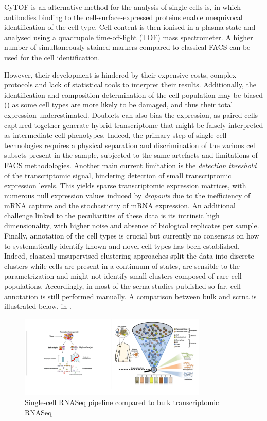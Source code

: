 CyTOF \autocite{nomizu_etal94} is an
alternative method for the analysis of single cells is, in which
antibodies binding to the cell-surface-expressed proteins enable
unequivocal identification of the cell type. Cell content is then
ionised in a plasma state and analysed using a quadrupole time-off-light
(TOF) mass spectrometer. A higher number of simultaneously stained
markers compared to classical FACS can be used for the cell
identification.

However, their development is hindered by their expensive costs, complex
protocols and lack of statistical tools to interpret their results.
Additionally, the identification and composition determination of the
cell population may be biased
(\autocite{lambrechts_etal18}) as
some cell types are more likely to be damaged, and thus their total
expression underestimated. Doublets can also bias the expression, as
paired cells captured together generate hybrid transcriptome that might
be falsely interpreted as intermediate cell phenotypes. Indeed, the
primary step of single cell technologies requires a physical separation
and discrimination of the various cell subsets present in the sample,
subjected to the same artefacts and limitations of FACS methodologies.
Another main current limitation is the \emph{detection threshold} of the
transcriptomic signal, hindering detection of small transcriptomic
expression levels. This yields sparse transcriptomic expression
matrices, with numerous null expression values induced by
\emph{dropouts} due to the inefficiency of mRNA capture and the
stochasticity of mRNA expression. An additional challenge linked to the
peculiarities of these data is its intrinsic high dimensionality, with
higher noise and absence of biological replicates per sample. Finally,
annotation of the cell types is crucial but currently no consensus on
how to systematically identify known and novel cell types has been
established. Indeed, classical unsupervised clustering approaches split
the data into discrete clusters while cells are present in a continuum
of states, are sensible to the parametrization and might not identify
small clusters composed of rare cell populations. Accordingly, in most
of the  \acrshort{scrna} studies published so far, cell annotation is still
performed manually. A comparison between bulk and \acrshort{scrna} is illustrated below, in .

\begin{figure}
\centering
\includegraphics[width=0.8\textwidth]{figures/single_cell_methodology.PNG}
\caption{ Single-cell RNASeq pipeline compared to bulk transcriptomic RNASeq}
\label{fig:scrna-vs-bulk}
\end{figure}




